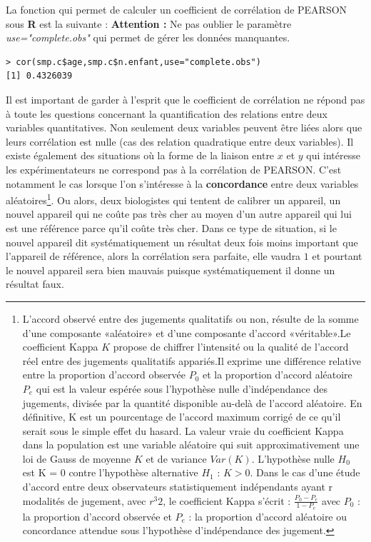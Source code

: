 La fonction qui permet de calculer un coefficient de corrélation de PEARSON sous \textbf{R} est la suivante :\newline
\textbf{Attention : } Ne pas oublier le paramètre \textit{use="complete.obs"} qui permet de gérer les données manquantes.
\begin{lstlisting}[language=html]
> cor(smp.c$age,smp.c$n.enfant,use="complete.obs")
[1] 0.4326039
\end{lstlisting}
Il est important de garder à l'esprit que le coefficient de corrélation ne répond pas à toute les questions concernant la quantification des relations entre deux variables quantitatives. Non seulement deux variables peuvent être liées alors que leurs corrélation est nulle (cas des relation quadratique entre deux variables).\newline
Il existe également des situations où la forme de la liaison entre $x$ et $y$ qui intéresse les expérimentateurs ne correspond pas à la corrélation de PEARSON. C'est notamment le cas lorsque l'on s'intéresse à la \textbf{concordance} entre deux variables aléatoires\footnote{L'accord observé entre des jugements qualitatifs ou non, résulte de la somme d'une composante «aléatoire» et d'une composante d'accord «véritable».Le coefficient Kappa $K$ propose de chiffrer l'intensité ou la qualité de l'accord réel entre des jugements qualitatifs appariés.Il exprime une différence relative entre la proportion d'accord observée $P_{0}$ et la proportion d'accord aléatoire $P_{e}$ qui est la valeur espérée sous l'hypothèse nulle d'indépendance des jugements, divisée par la quantité disponible au-delà de l'accord aléatoire. En définitive, K est un pourcentage de l'accord maximum corrigé de ce qu'il serait sous le simple effet du hasard. La valeur vraie du coefficient Kappa dans la population est une variable aléatoire qui suit approximativement une loi de Gauss de moyenne $K$ et de variance $Var(K)$. L'hypothèse nulle $H_{0}$ est K = 0 contre l'hypothèse alternative $H_{1}$ : $K > 0$. Dans le cas d'une étude d'accord entre deux observateurs statistiquement indépendants ayant r modalités de jugement, avec $r^{3}2$, le coefficient Kappa s'écrit : $\frac{P_{0}-P_{e}}{1-P_{e}}$ avec $P_{0}$ : la proportion d'accord observée et $P_{e}$ : la proportion d'accord aléatoire ou concordance attendue sous l'hypothèse d'indépendance des jugement.}. 
Ou alors, deux biologistes qui tentent de calibrer un appareil, un nouvel appareil qui ne coûte pas très cher au moyen d'un autre appareil qui lui est une référence parce qu'il coûte très cher. Dans ce type de situation, si le nouvel appareil dit systématiquement un résultat deux fois moins important que l'appareil de référence, alors la corrélation sera parfaite, elle vaudra $1$ et pourtant le nouvel appareil sera bien mauvais puisque systématiquement il donne un résultat faux.


